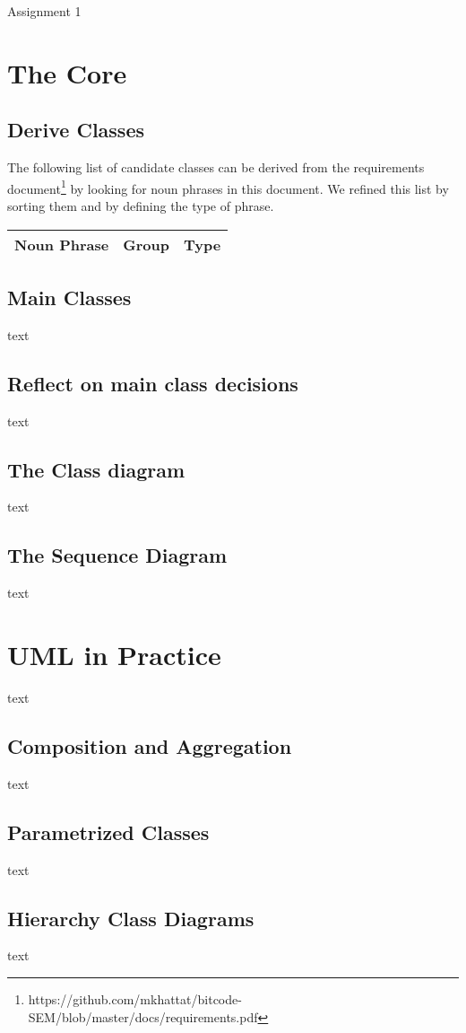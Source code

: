 \documentclass{article}
\begin{document}
\begin{titlepage}
	\Huge{Assignment 1}
\end{titlepage}


\section{The Core}

\subsection{Derive Classes}

The following list of candidate classes can be derived from the requirements document\footnote{https://github.com/mkhattat/bitcode-SEM/blob/master/docs/requirements.pdf} by looking for noun phrases in this document. We refined this list by sorting them and by defining the type of phrase.

\begin{center}
    \begin{tabular}{ | l | l | l |}
    \hline
    Noun Phrase & Group & Type \\ \hline
    
    \end{tabular}
\end{center}

\subsection{Main Classes}
text

\subsection{Reflect on main class decisions}
text

\subsection{The Class diagram}
text

\subsection{The Sequence Diagram}
text




\section{UML in Practice}
text

\subsection{Composition and Aggregation}
text

\subsection{Parametrized Classes}
text

\subsection{Hierarchy Class Diagrams}
text
\end{document}
